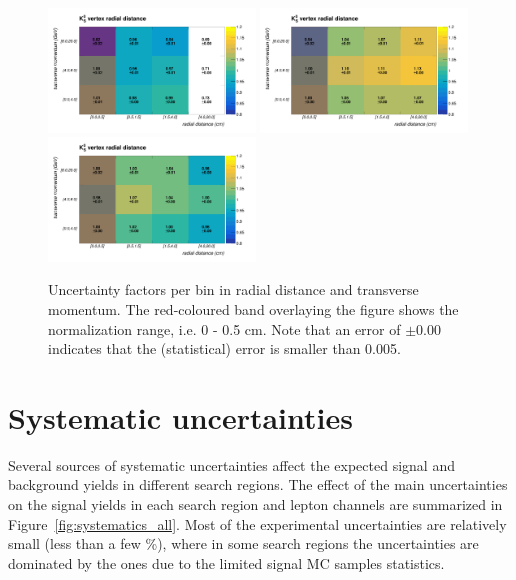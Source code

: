 \begin{figure}[h!]
	\centering	
	\includegraphics[width=0.49\textwidth]{Figures/c6/efficiencies/2dplots/2016tot/smallrange.pdf}
	\includegraphics[width=0.49\textwidth]{Figures/c6/efficiencies/2dplots/2017tot/smallrange.pdf}\\
	\includegraphics[width=0.49\textwidth]{Figures/c6/efficiencies/2dplots/2018tot/smallrange.pdf}
	\caption{Uncertainty factors per bin in radial distance and
          transverse momentum. The red-coloured band overlaying the
          figure shows the normalization range, i.e. 0 - 0.5 cm. Note
          that an error of $\pm 0.00$ indicates that the (statistical)
          error is smaller than 0.005. \luka}
	\label{fig:2dplots}
\end{figure}

\section{Systematic uncertainties}\label{sec:llsystematic}
Several sources of systematic uncertainties affect the expected signal
and background yields in different search regions. 
The effect of the main uncertainties on the signal yields in each
search region and lepton channels are summarized in
Figure~\ref{fig:systematics_all}. 
Most of the experimental uncertainties are relatively small (less than
a few \%), where in some search regions the uncertainties are
dominated by the ones due to the limited signal MC samples statistics. 

